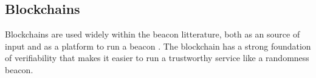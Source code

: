 \subsection{Blockchains}
Blockchains are used widely within the beacon litterature, both as an source of input \cite{bonneau2015bitcoin, bentov2016bitcoin, bunz2017proofsof} and as a platform to run a beacon \cite{randao, bunz2017proofsof}. The blockchain has a strong foundation of verifiability that makes it easier to run a trustworthy service like a randomness beacon. 